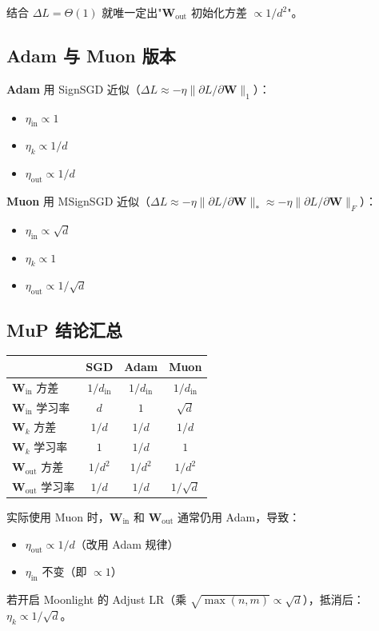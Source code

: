 \documentclass[11pt,a4paper]{ctexart}
\theoremstyle{definition}
\theoremstyle{remark}
\newcommand{\bigT}{\Theta}
\begin{document}
结合 $\Delta L = \bigT(1)$ 就唯一定出"$\bm{W}_\text{out}$ 初始化方差 $\propto 1/d^2$"。
 
\subsection{Adam 与 Muon 版本}
 
\textbf{Adam} 用 SignSGD 近似（$\Delta L \approx -\eta \|\partial L/\partial \bm{W}\|_1$）：
\begin{itemize}
    \item $\eta_\text{in} \propto 1$
    \item $\eta_k \propto 1/d$  
    \item $\eta_\text{out} \propto 1/d$
\end{itemize}
 
\textbf{Muon} 用 MSignSGD 近似（$\Delta L \approx -\eta \|\partial L/\partial \bm{W}\|_* \approx -\eta \|\partial L/\partial \bm{W}\|_F$）：
\begin{itemize}
    \item $\eta_\text{in} \propto \sqrt{d}$
    \item $\eta_k \propto 1$
    \item $\eta_\text{out} \propto 1/\sqrt{d}$
\end{itemize}
 
\subsection{MuP 结论汇总}
 
\begin{center}
\renewcommand{\arraystretch}{1.4}
\begin{tabular}{lccc}
\toprule
& SGD & Adam & Muon \\
\midrule
$\bm{W}_\text{in}$ 方差 & $1/d_\text{in}$ & $1/d_\text{in}$ & $1/d_\text{in}$ \\
$\bm{W}_\text{in}$ 学习率 & $d$ & $1$ & $\sqrt{d}$ \\
$\bm{W}_k$ 方差 & $1/d$ & $1/d$ & $1/d$ \\
$\bm{W}_k$ 学习率 & $1$ & $1/d$ & $1$ \\
$\bm{W}_\text{out}$ 方差 & $1/d^2$ & $1/d^2$ & $1/d^2$ \\
$\bm{W}_\text{out}$ 学习率 & $1/d$ & $1/d$ & $1/\sqrt{d}$ \\
\bottomrule
\end{tabular}
\end{center}
 
\begin{recipe}
实际使用 Muon 时，$\bm{W}_\text{in}$ 和 $\bm{W}_\text{out}$ 通常仍用 Adam，导致：
\begin{itemize}
    \item $\eta_\text{out} \propto 1/d$（改用 Adam 规律）
    \item $\eta_\text{in}$ 不变（即 $\propto 1$）
\end{itemize}
若开启 Moonlight 的 Adjust LR（乘 $\sqrt{\max(n,m)} \propto \sqrt{d}$），抵消后：$\eta_k \propto 1/\sqrt{d}$。
\end{recipe}
 
\end{document}
